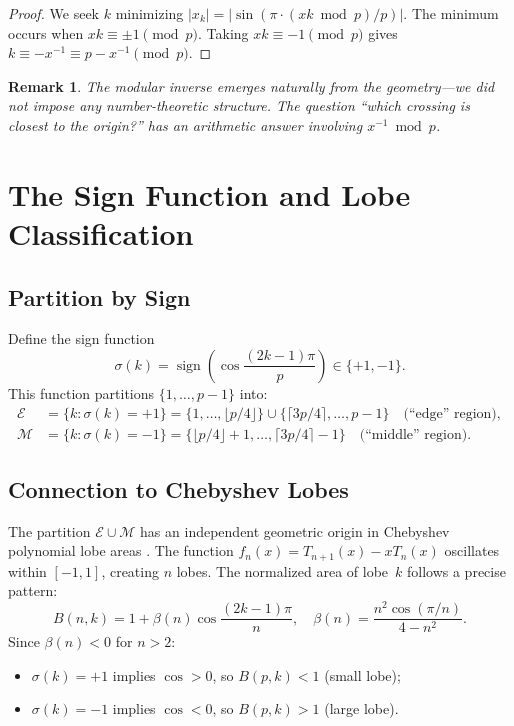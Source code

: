 \documentclass[11pt,a4paper]{article}
\newtheorem{remark}{Remark}
\begin{document}
\begin{proof}
We seek $k$ minimizing $|x_k| = |\sin(\pi \cdot (xk \bmod p) / p)|$. The minimum occurs when $xk \equiv \pm 1 \pmod p$. Taking $xk \equiv -1 \pmod p$ gives $k \equiv -x^{-1} \equiv p - x^{-1} \pmod p$.
\end{proof}

\begin{remark}
The modular inverse emerges naturally from the geometry---we did not impose any number-theoretic structure. The question ``which crossing is closest to the origin?'' has an arithmetic answer involving $x^{-1} \bmod p$.
\end{remark}

\section{The Sign Function and Lobe Classification}\label{sec:sign}

\subsection{Partition by Sign}

Define the sign function
\[
\sigma(k) = \operatorname{sign}\left(\cos\frac{(2k-1)\pi}{p}\right) \in \{+1, -1\}.
\]
This function partitions $\{1, \ldots, p-1\}$ into:
\begin{align*}
\mathcal{E} &= \{k : \sigma(k) = +1\} = \{1, \ldots, \lfloor p/4 \rfloor\} \cup \{\lceil 3p/4 \rceil, \ldots, p-1\} \quad \text{(``edge'' region)}, \\
\mathcal{M} &= \{k : \sigma(k) = -1\} = \{\lfloor p/4 \rfloor + 1, \ldots, \lceil 3p/4 \rceil - 1\} \quad \text{(``middle'' region)}.
\end{align*}

\subsection{Connection to Chebyshev Lobes}

The partition $\mathcal{E} \cup \mathcal{M}$ has an independent geometric origin in Chebyshev polynomial lobe areas \cite{Popelka2025integral}. The function $f_n(x) = T_{n+1}(x) - x T_n(x)$ oscillates within $[-1, 1]$, creating $n$ lobes. The normalized area of lobe~$k$ follows a precise pattern:
\begin{equation}\label{eq:lobe-fourier}
B(n, k) = 1 + \beta(n) \cos\frac{(2k-1)\pi}{n}, \quad \beta(n) = \frac{n^2 \cos(\pi/n)}{4 - n^2}.
\end{equation}
Since $\beta(n) < 0$ for $n > 2$:
\begin{itemize}
\item $\sigma(k) = +1$ implies $\cos > 0$, so $B(p,k) < 1$ (small lobe);
\item $\sigma(k) = -1$ implies $\cos < 0$, so $B(p,k) > 1$ (large lobe).
\end{itemize}
\end{document}
